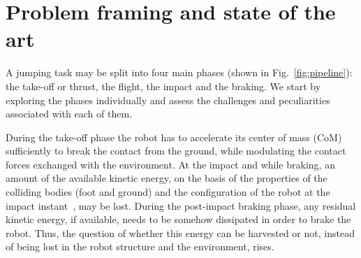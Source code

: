 \section{Problem framing and state of the art}\label{sec:prb_def}
A jumping task may be split into four main phases (shown in Fig.~\ref{fig:pipeline}): the take-off or thrust, the flight, the impact and the braking. We start by exploring the phases individually and assess the challenges and peculiarities associated with each of them.

During the take-off phase the robot has to accelerate its center of mass (CoM) sufficiently to break the contact from the ground, while modulating the contact forces exchanged with the environment.
At the impact and while braking, an amount of the available kinetic energy, on the basis of the properties of the colliding bodies (foot and ground) and the configuration of the robot at the impact instant~\cite{impact_dyn::walker1994impact},
may be lost.
During the post-impact braking phase, any residual kinetic energy, if available, needs to be somehow dissipated in order to brake the robot. Thus, the question of whether this energy can be harvested or not, instead of being lost in the robot structure and the environment, rises.
